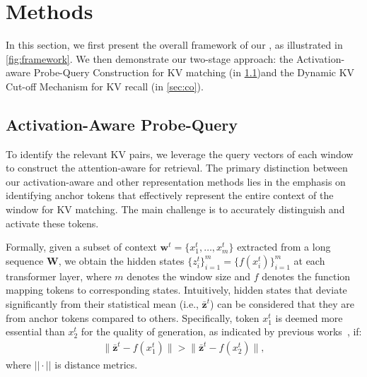 


\section{Methods}

In this section, we first present the overall framework of our \name, as illustrated in \cref{fig:framework}. We then demonstrate our two-stage approach: the Activation-aware Probe-Query Construction for KV matching (in \cref{sec:pq})and the Dynamic KV Cut-off Mechanism for KV recall (in \cref{sec:co}).



\subsection{Activation-Aware Probe-Query}
\label{sec:pq}
To identify the relevant KV pairs, we leverage the query vectors of each window to construct the attention-aware \pq for retrieval.
The primary distinction between our activation-aware \pq and other representation methods lies in the emphasis on identifying anchor tokens that effectively represent the entire context of the window for KV matching. The main challenge is to accurately distinguish and activate these tokens.

Formally, given a subset of context $\mathbf{w}^t = \{x^{t}_{1}, \dots, x^{t}_{m}\}$ extracted from a long sequence $\mathbf{W}$, we obtain the hidden states $\{z^{t}_{i}\}_{i=1}^m=\{f(x^{t}_{i})\}_{i=1}^m$ at each transformer layer, where $m$ denotes the window size and $f$ denotes the function mapping tokens to corresponding states. Intuitively, hidden states that deviate significantly from their statistical mean (i.e., $\mathbf{\bar{z}}^t$) can be considered that they are from anchor tokens compared to others. Specifically, token ${x}^{t}_{1}$ is deemed more essential than ${x}^{t}_{2}$ for the quality of generation, as indicated by previous works~\cite{wang2024learning, sun2024massive,pang-etal-2024-anchor}, if:
\begin{equation}
\begin{aligned}
\| \mathbf{\bar{z}}^t - f(x^{t}_{1}) \| > \| \mathbf{\bar{z}}^t - f(x^{t}_{2}) \|,
\label{eq:activation}
\end{aligned}
\end{equation}
where $||\cdot||$ is distance metrics.

